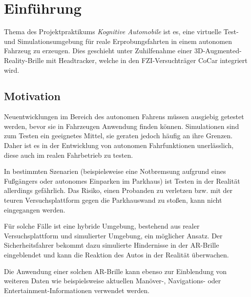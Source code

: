 
\section{Einführung}
\label{einleitung_sec}

Thema des Projektpraktikums \emph{Kognitive Automobile} ist es, eine virtuelle Test- und Simulationsumgebung für reale Erprobungsfahrten in einem autonomen Fahrzeug zu erzeugen.
Dies geschieht unter Zuhilfenahme einer 3D-Augmented-Reality-Brille mit Headtracker, welche in den \ac{FZI}-Versuchträger CoCar integriert wird.


\subsection{Motivation}
\label{einleitung_motivation_subsec}


Neuentwicklungen im Bereich des autonomen Fahrens müssen ausgiebig getestet werden, bevor sie in Fahrzeugen Anwendung finden können.
Simulationen sind zum Testen ein geeignetes Mittel, sie geraten jedoch häufig an ihre Grenzen.
Daher ist es in der Entwicklung von autonomen Fahrfunktionen unerlässlich, diese auch im realen Fahrbetrieb zu testen.

In bestimmten Szenarien (beispielsweise eine Notbremsung aufgrund eines Fußgängers oder autonomes Einparken im Parkhaus) ist Testen in der Realität allerdings gefährlich.
Das Risiko, einen Probanden zu verletzen bzw. mit der teuren Versuchsplattform gegen die Parkhauswand zu stoßen, kann nicht eingegangen werden.

Für solche Fälle ist eine hybride Umgebung, bestehend aus realer Versuchsplattform und simulierter Umgebung, ein möglicher Ansatz.
Der Sicherheitsfahrer bekommt dazu simulierte Hindernisse in der \ac{AR}-Brille eingeblendet und kann die Reaktion des Autos in der Realität überwachen.

Die Anwendung einer solchen \ac{AR}-Brille kann ebenso zur Einblendung von weiteren Daten wie beispielsweise aktuellen Manöver-, Navigations- oder Entertainment-Informationen verwendet werden.



